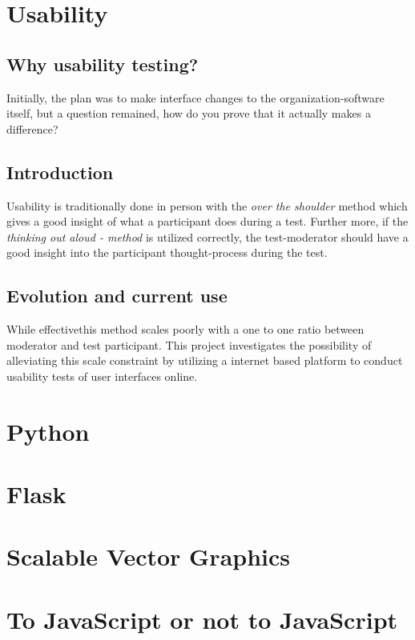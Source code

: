 \section{Usability}

  \subsection{Why usability testing?}

    Initially, the plan was to make interface changes to the
    organization-software itself, but a question remained, how do you prove
    that it actually makes a difference?


  \subsection{Introduction}

    Usability is traditionally done in person with the \textit{over the
    shoulder} method which gives a good insight of what a participant does
    during a test. Further more, if the \textit{thinking out aloud -
    method} is utilized correctly, the test-moderator should have a good
    insight into the participant thought-process during the test.

  \subsection{Evolution and current use}

    While effective\checkTruth this method scales poorly with a one to one
    ratio between moderator and test participant. This project investigates
    the possibility of alleviating this scale constraint by utilizing a
    internet based platform to conduct usability tests of user interfaces
    online.



\section{Python}

\section{Flask}

\section{Scalable Vector Graphics}

\section{To JavaScript or not to JavaScript}
